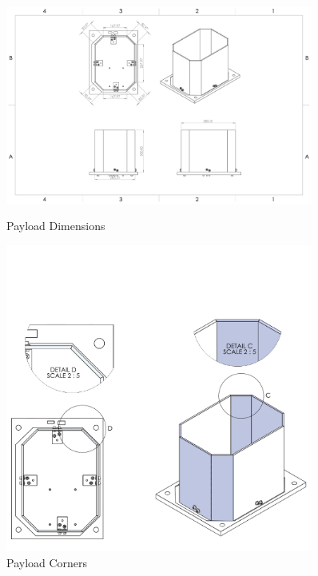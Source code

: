 \begin{figure}[H]
    \centering
    \begin{minipage}{0.45\textwidth}
        \centering
        \includegraphics[width=0.9\textwidth]{figures/payload_dimensions.PDF} %
        \caption{Payload Dimensions}
        	\label{fig:payload_dim}
    \end{minipage}\hfill
    \begin{minipage}{0.45\textwidth}
        \centering
        \includegraphics[width=0.9\textwidth]{figures/payload_corners.PDF} %
        \caption{Payload Corners}
        	\label{fig:payload_corn}
    \end{minipage}
\end{figure}
%

